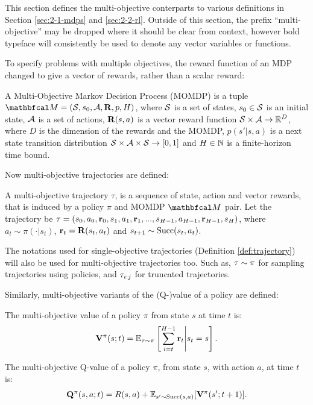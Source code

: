     This section defines the multi-objective conterparts to various definitions in Section \ref{sec:2-1-mdps} and \ref{sec:2-2-rl}. Outside of this section, the prefix ``multi-objective'' may be dropped where it should be clear from context, however bold typeface will consistently be used to denote any vector variables or functions.

    To specify problems with multiple objectives, the reward function of an MDP changed to give a vector of rewards, rather than a scalar reward:
    \begin{defn}
        \label{def:mo_mdp}
        A \textnormal{Multi-Objective Markov Decision Process} (MOMDP) is a tuple $\bfcl{M}=(\cl{S},s_0,\cl{A},\bff{R},p,H)$, where $\mathcal{S}$ is a set of states, $s_0\in\mathcal{S}$ is an initial state, $\mathcal{A}$ is a set of actions, $\mathbf{R}(s,a)$ is a vector reward function $\mathcal{S}\times \mathcal{A}\rightarrow \mathbb{R}^D$, where $D$ is the dimension of the rewards and the MOMDP, $p(s' | s,a)$ is a next state transition distribution $\mathcal{S} \times \mathcal{A} \times \mathcal{S} \rightarrow [0,1]$ and $H\in\mathbb{N}$ is a finite-horizon time bound.
    \end{defn}

    Now multi-objective trajectories are defined:
    \begin{defn}
        \label{def:mo_trajectory}
        A \textnormal{multi-objective trajectory} $\tau$, is a sequence of state, action and vector rewards, that is induced by a policy $\pi$ and MOMDP $\bfcl{M}$ pair. Let the trajectory be $\mathbf{\tau} = (s_0, a_0, \mathbf{r}_0, s_1, a_1, \mathbf{r}_1, ..., s_{H-1}, a_{H-1}, \mathbf{r}_{H-1}, s_H)$, where $a_t \sim \pi(\cdot|s_t)$, $\mathbf{r}_t=\mathbf{R}(s_t,a_t)$ and $s_{t+1} \sim {\textnormal{Succ}(s_t,a_t)}$. 
        
        The notations used for single-objective trajectories (Definition \ref{def:trajectory}) will also be used for multi-objective trajectories too. Such as, $\mathbf{\tau}\sim\pi$ for sampling trajectories using policies, and $\mathbf{\tau}_{i:j}$ for truncated trajectories.
    \end{defn}

    Similarly, multi-objective variants of the (Q-)value of a policy are defined:    
    \begin{defn}
        \label{def:mo_value}
        \label{def:mo_q_value}
        The \textnormal{multi-objective value} of a policy $\pi$ from state $s$ at time $t$ is:
        \begin{align}
            \mathbf{V}^{\pi}(s;t) = \mathbb{E}_{\mathbf{\tau}\sim\pi}\left[\sum_{i=t}^{H-1} \mathbf{r}_t \Bigg| s_t=s \right].
        \end{align} 

        The \textnormal{multi-objective Q-value} of a policy $\pi$, from state $s$, with action $a$, at time $t$ is:
        \begin{align}
            \mathbf{Q}^{\pi}(s,a;t) = R(s,a) + \mathbb{E}_{s'\sim {\textnormal{Succ}(s,a)}} [\mathbf{V}^{\pi}(s';t+1)].
        \end{align} 
    \end{defn}

